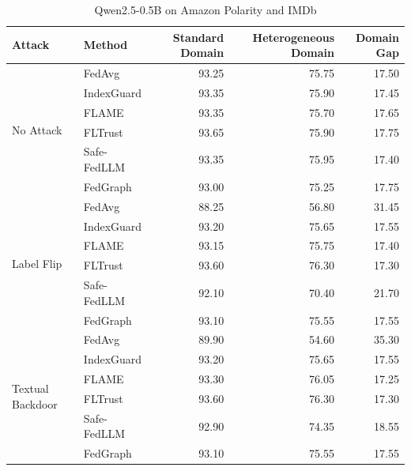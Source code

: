 \documentclass[10pt]{article}
\begin{document}
\begin{table}[htbp]
\centering
\caption{Qwen2.5-0.5B on Amazon Polarity and IMDb}
\label{tab:qwen05_amazon_imdb}
\small
\begin{tabular}{llrrr}
\toprule
Attack & Method & Standard Domain & Heterogeneous Domain & Domain Gap \\
\midrule
\multirow{6}{*}{No Attack} & FedAvg & 93.25 & 75.75 & 17.50 \\
 & IndexGuard & 93.35 & 75.90 & 17.45 \\
 & FLAME & 93.35 & 75.70 & 17.65 \\
 & FLTrust & 93.65 & 75.90 & 17.75 \\
 & Safe-FedLLM & 93.35 & 75.95 & 17.40 \\
 & FedGraph & 93.00 & 75.25 & 17.75 \\
\midrule
\multirow{6}{*}{Label Flip} & FedAvg & 88.25 & 56.80 & 31.45 \\
 & IndexGuard & 93.20 & 75.65 & 17.55 \\
 & FLAME & 93.15 & 75.75 & 17.40 \\
 & FLTrust & 93.60 & 76.30 & 17.30 \\
 & Safe-FedLLM & 92.10 & 70.40 & 21.70 \\
 & FedGraph & 93.10 & 75.55 & 17.55 \\
\midrule
\multirow{6}{*}{Textual Backdoor} & FedAvg & 89.90 & 54.60 & 35.30 \\
 & IndexGuard & 93.20 & 75.65 & 17.55 \\
 & FLAME & 93.30 & 76.05 & 17.25 \\
 & FLTrust & 93.60 & 76.30 & 17.30 \\
 & Safe-FedLLM & 92.90 & 74.35 & 18.55 \\
 & FedGraph & 93.10 & 75.55 & 17.55 \\
\bottomrule
\end{tabular}
\end{table}
\clearpage
\end{document}

